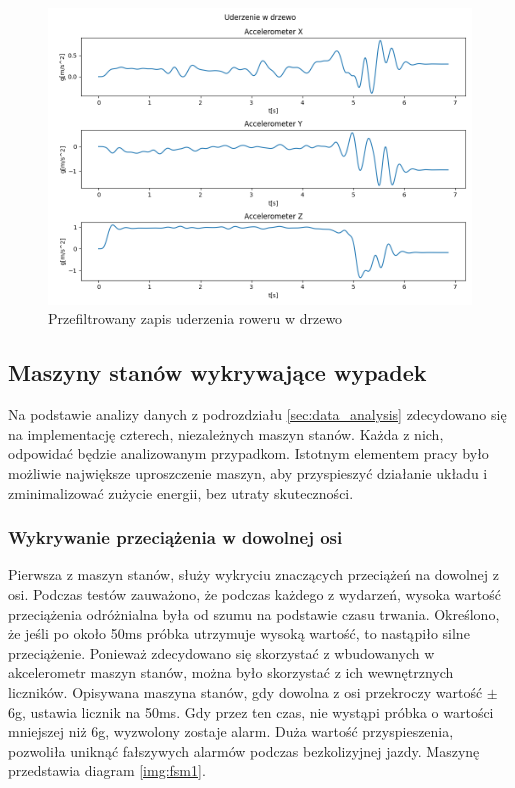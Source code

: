 \begin{figure}[h]
    \centering
    \includegraphics[width=15cm]{Graphics/Tree_title.png}
    \caption{Przefiltrowany zapis uderzenia roweru w drzewo}
    \label{img:tree}
\end{figure}

\subsection{Maszyny stanów wykrywające wypadek}
\label{sec:state_machines}
Na podstawie analizy danych z podrozdziału \ref{sec:data_analysis} zdecydowano się na implementację czterech, niezależnych maszyn stanów. Każda z nich, odpowidać będzie analizowanym przypadkom. Istotnym elementem pracy było możliwie największe uproszczenie maszyn, aby przyspieszyć działanie układu i zminimalizować zużycie energii, bez utraty skuteczności.
\subsubsection{Wykrywanie przeciążenia w dowolnej osi}
Pierwsza z maszyn stanów, służy wykryciu znaczących przeciążeń na dowolnej z osi. Podczas testów zauważono, że podczas każdego z wydarzeń, wysoka wartość przeciążenia odróżnialna była od szumu na podstawie czasu trwania. Określono, że jeśli po około 50ms próbka utrzymuje wysoką wartość, to nastąpiło silne przeciążenie. Ponieważ zdecydowano się skorzystać z wbudowanych w akcelerometr maszyn stanów, można było skorzystać z ich wewnętrznych liczników. Opisywana maszyna stanów, gdy dowolna z osi przekroczy wartość $\pm$6g, ustawia licznik na 50ms. Gdy przez ten czas, nie wystąpi próbka o wartości mniejszej niż 6g, wyzwolony zostaje alarm. Duża wartość przyspieszenia, pozwoliła uniknąć fałszywych alarmów podczas bezkolizyjnej jazdy. Maszynę przedstawia diagram \ref{img:fsm1}.
\newline
\newline

